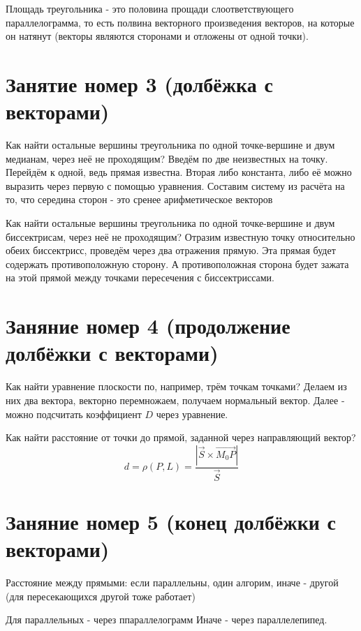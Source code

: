 \documentclass[12pt, a4paper]{article}
\begin{document}
    Площадь треугольника  - это половина прощади слоответствующего параллелограмма, то есть полвина векторного произведения векторов, на которые он натянут 
    (векторы являются сторонами и отложены от одной точки).

    \section{Занятие номер 3 (долбёжка с векторами)}
    
    
    Как найти остальные вершины треугольника по одной точке-вершине и двум медианам, через неё не проходящим? 
    Введём по две неизвестных на точку. Перейдём к одной, ведь прямая известна. Вторая либо константа, либо её можно выразить через первую с помощью уравнения. 
    Составим систему из расчёта на то, что середина сторон - это сренее арифметическое векторов

    Как найти остальные вершины треугольника по одной точке-вершине и двум биссектрисам, через неё не проходящим?
    Отразим известную точку относительно обеих биссектрисс, проведём через два отражения прямую. Эта прямая будет содержать противоположную сторону.
	А противоположная сторона будет зажата на этой прямой между точками пересечения с биссектриссами.

	\section{Заняние номер 4 (продолжение долбёжки с векторами)}
 
	Как найти уравнение плоскости по, например, трём точкам точками? Делаем из них два вектора, векторно перемножаем, получаем нормальный вектор.
	Далее - можно подсчитать коэффициент $D$ через уравнение.

	Как найти расстояние от точки до прямой, заданной через направляющий вектор?
	\begin{equation}
		d = \rho(P, L) = \frac{|\vec{S} \times \vec{M_0 P}|}{\vec{S}}
	\end{equation}

    \section{Заняние номер 5 (конец долбёжки с векторами)}
    
    Расстояние между прямыми: если параллельны, один алгорим, иначе - другой (для пересекающихся другой тоже работает)

    Для параллельных - через ппараллелограмм
    Иначе - через параллелепипед.
    
\end{document}
